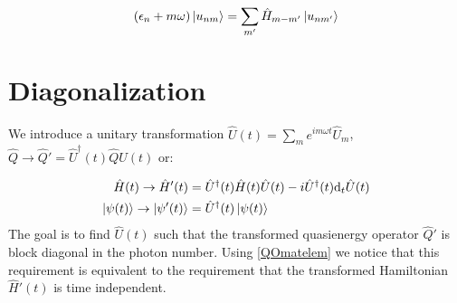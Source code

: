 \begin{equation}
(\epsilon_n+m\omega)\ket{u_{nm}} = \sum_{m'}\hat{H}_{m-m'}\ket{u_{nm'}}
\end{equation}

\section{Diagonalization}

We introduce a unitary transformation $\hat{U}(t)=\sum_m e^{im\omega t}\hat{U}_m$, $\hat{Q} \rightarrow \hat{Q}'=\hat{U}^{\dagger}(t)\hat{Q}\hat{U}(t)$ or:

\begin{align}
\hat{H}(t) \rightarrow \hat{H}'(t) &= \hat{U}^{\dagger}(t)\hat{H}(t)\hat{U}(t) - i\hat{U}^{\dagger}(t)\text{d}_t\hat{U}(t) \\
\ket{\psi(t)} \rightarrow \ket{\psi'(t)} &= \hat{U}^{\dagger}(t)\ket{\psi(t)}
\end{align}
The goal is to find $\hat{U}(t)$ such that the transformed quasienergy operator $\hat{Q}'$ is block diagonal in the photon number. Using \ref{QOmatelem} we notice that this requirement is equivalent to the requirement that the transformed Hamiltonian $\hat{H}'(t)$ is time independent.

















